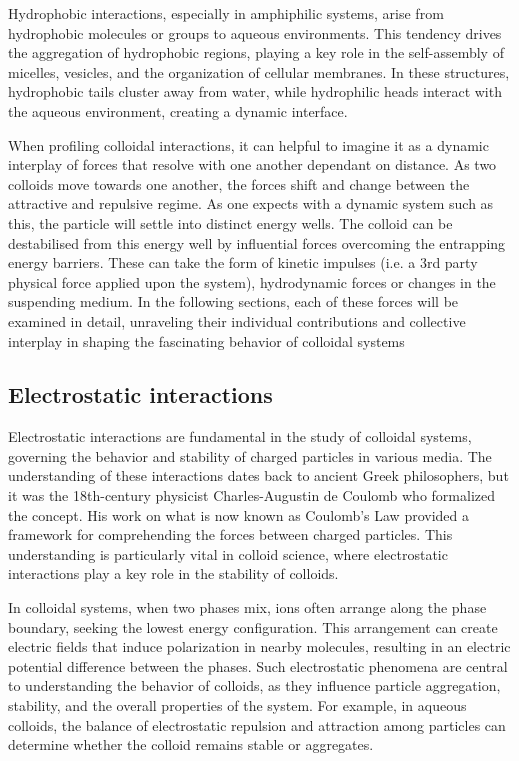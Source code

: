 Hydrophobic interactions, especially in amphiphilic systems, arise from hydrophobic molecules or groups to aqueous environments. This tendency drives the aggregation of hydrophobic regions, playing a key role in the self-assembly of micelles, vesicles, and the organization of cellular membranes. In these structures, hydrophobic tails cluster away from water, while hydrophilic heads interact with the aqueous environment, creating a dynamic interface. 

When profiling colloidal interactions, it can helpful to imagine it as a dynamic interplay of forces that resolve with one another dependant on distance. As two colloids move towards one another, the forces shift and change between the attractive and repulsive regime. As one expects with a dynamic system such as this, the particle will settle into distinct energy wells. The colloid can be destabilised from this energy well by influential forces overcoming the entrapping energy barriers. These can take the form of kinetic impulses (i.e. a 3rd party physical force applied upon the system), hydrodynamic forces or changes in the suspending medium. In the following sections, each of these forces will be examined in detail, unraveling their individual contributions and collective interplay in shaping the fascinating behavior of colloidal systems


\subsection{Electrostatic interactions} %
Electrostatic interactions are fundamental in the study of colloidal systems, governing the behavior and stability of charged particles in various media. The understanding of these interactions dates back to ancient Greek philosophers, but it was the 18th-century physicist Charles-Augustin de Coulomb who formalized the concept. His work on what is now known as Coulomb's Law provided a framework for comprehending the forces between charged particles. This understanding is particularly vital in colloid science, where electrostatic interactions play a key role in the stability of colloids. \cite{halliday2013fundamentals}

In colloidal systems, when two phases mix, ions often arrange along the phase boundary, seeking the lowest energy configuration. This arrangement can create electric fields that induce polarization in nearby molecules, resulting in an electric potential difference between the phases. Such electrostatic phenomena are central to understanding the behavior of colloids, as they influence particle aggregation, stability, and the overall properties of the system. For example, in aqueous colloids, the balance of electrostatic repulsion and attraction among particles can determine whether the colloid remains stable or aggregates.

